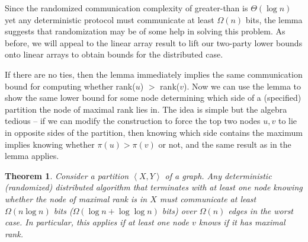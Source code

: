 \documentclass[twocolumn]{article}
\newtheorem{theorem}{Theorem}
\begin{document}
Since the randomized communication complexity of greater-than is $\Theta(\log n)$ yet any deterministic protocol must communicate at least $\Omega(n)$ bits, the lemma suggests that randomization may be of some help in solving this problem. As before, we will appeal to the linear array result to lift our two-party lower bounds onto linear arrays to obtain bounds for the distributed case.

If there are no ties, then the lemma immediately implies the same communication bound for computing whether rank($u$) $>$ rank($v$). Now we can use the lemma to show the same lower bound for some node determining which side of a (specified) partition the node of maximal rank lies in. The idea is simple but the algebra tedious -- if we can modify the construction to force the top two nodes $u,v$ to lie in opposite sides of the partition, then knowing which side contains the maximum implies knowing whether $\pi(u) > \pi(v)$ or not, and the same result as in the lemma applies.
\begin{theorem}
\label{thm:ranks}
Consider a partition $\left<X,Y\right>$ of a graph. Any deterministic (randomized) distributed algorithm that terminates with at least one node knowing whether the node of maximal rank is in $X$ must communicate at least $\Omega(n \log n)$ bits ($\Omega(\log n + \log \log n)$ bits) over $\Omega(n)$ edges in the worst case. In particular, this applies if at least one node $v$ knows if it has maximal rank.
\end{theorem}
\end{document}
